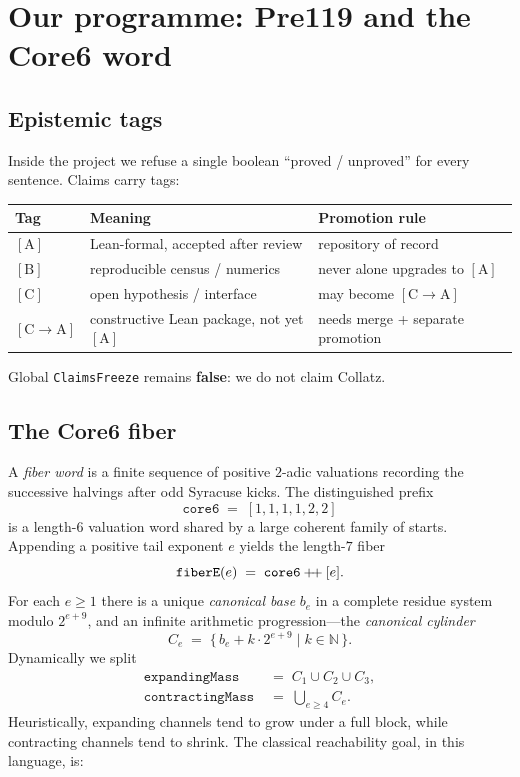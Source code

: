 \documentclass[11pt,a4paper]{article}
\theoremstyle{definition}
\theoremstyle{remark}
\newcommand{\CA}{\ensuremath{[\mathrm{C}\!\to\!\mathrm{A}]}}
\newcommand{\tagA}{\ensuremath{[\mathrm{A}]}}
\newcommand{\tagB}{\ensuremath{[\mathrm{B}]}}
\newcommand{\tagC}{\ensuremath{[\mathrm{C}]}}
\begin{document}
\section{Our programme: Pre119 and the Core6 word}

\subsection{Epistemic tags}
Inside the project we refuse a single boolean ``proved / unproved'' for every
sentence.
Claims carry tags:
\begin{center}
\begin{tabular}{@{}lll@{}}
\toprule
Tag & Meaning & Promotion rule \\
\midrule
\tagA & Lean-formal, accepted after review & repository of record \\
\tagB & reproducible census / numerics & never alone upgrades to \tagA \\
\tagC & open hypothesis / interface & may become \CA \\
\CA & constructive Lean package, not yet \tagA & needs merge + separate promotion \\
\bottomrule
\end{tabular}
\end{center}
Global \texttt{ClaimsFreeze} remains \textbf{false}: we do not claim Collatz.

\subsection{The Core6 fiber}
A \emph{fiber word} is a finite sequence of positive $2$-adic valuations
recording the successive halvings after odd Syracuse kicks.
The distinguished prefix
\[
  \mathtt{core6}
  \;=\;
  [1,1,1,1,2,2]
\]
is a length-$6$ valuation word shared by a large coherent family of starts.
Appending a positive tail exponent $e$ yields the length-$7$ fiber
\[
  \mathtt{fiberE}(e)
  \;=\;
  \mathtt{core6}\mathbin{+\kern-0.2em+}[e].
\]
For each $e\ge 1$ there is a unique \emph{canonical base} $b_e$ in a complete
residue system modulo $2^{e+9}$, and an infinite arithmetic progression---the
\emph{canonical cylinder}
\[
  C_e
  \;=\;
  \bigl\{\, b_e + k\cdot 2^{e+9}
  \;\big|\;
  k\in\mathbb{N}\,\bigr\}.
\]
Dynamically we split
\begin{align*}
  \mathtt{expandingMass}
  &\;=\; C_1\cup C_2\cup C_3,\\
  \mathtt{contractingMass}
  &\;=\; \textstyle\bigcup_{e\ge 4} C_e.
\end{align*}
Heuristically, expanding channels tend to grow under a full block, while
contracting channels tend to shrink.
The classical reachability goal, in this language, is:
\end{document}
